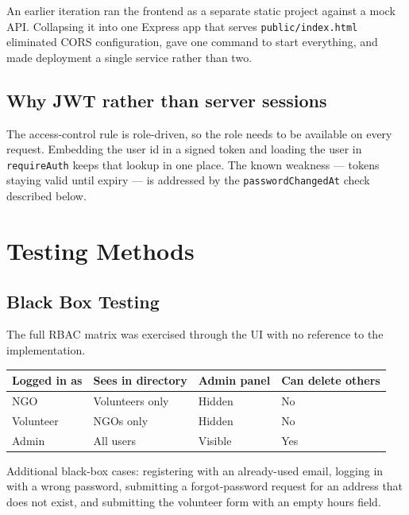 \documentclass[11pt,letterpaper]{article}
\begin{document}
An earlier iteration ran the frontend as a separate static project against a
mock API. Collapsing it into one Express app that serves
\texttt{public/index.html} eliminated CORS configuration, gave one command to
start everything, and made deployment a single service rather than two.

\subsection{Why JWT rather than server sessions}

The access-control rule is role-driven, so the role needs to be available on
every request. Embedding the user id in a signed token and loading the user in
\texttt{requireAuth} keeps that lookup in one place. The known weakness ---
tokens staying valid until expiry --- is addressed by the
\texttt{passwordChangedAt} check described below.

\section{Testing Methods}

\subsection{Black Box Testing}

The full RBAC matrix was exercised through the UI with no reference to the
implementation.

\begin{center}
\begin{tabular}{@{}llll@{}}
\toprule
\textbf{Logged in as} & \textbf{Sees in directory} & \textbf{Admin panel} & \textbf{Can delete others}\\
\midrule
NGO       & Volunteers only & Hidden  & No\\
Volunteer & NGOs only       & Hidden  & No\\
Admin     & All users       & Visible & Yes\\
\bottomrule
\end{tabular}
\end{center}

Additional black-box cases: registering with an already-used email, logging in
with a wrong password, submitting a forgot-password request for an address
that does not exist, and submitting the volunteer form with an empty hours field.
\end{document}
